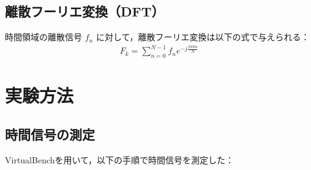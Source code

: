 \documentclass[11pt,dvipdfmx]{jarticle}
\begin{document}
\subsection{離散フーリエ変換（DFT）}
時間領域の離散信号 $f_n$ に対して，離散フーリエ変換は以下の式で与えられる：
\begin{eqnarray}
F_k = \sum_{n=0}^{N-1} f_n e^{-j \frac{2\pi kn}{N}}
\end{eqnarray}

\section{実験方法}

\subsection{時間信号の測定}
VirtualBenchを用いて，以下の手順で時間信号を測定した：
\end{document}
